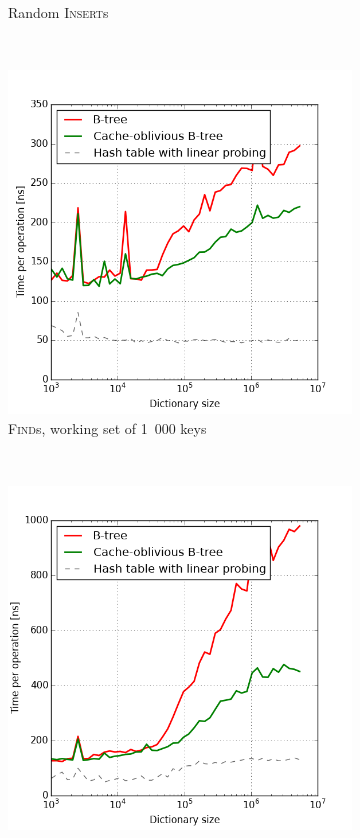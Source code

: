 \begin{figure}
\begin{subfigure}[b]{0.45\textwidth}
	\caption{Random \textsc{Insert}s}
\end{subfigure}
~
\begin{subfigure}[b]{0.45\textwidth}
	\includegraphics[width=\textwidth]{img/performance/cob-performance-3}
	\caption{\textsc{Find}s, working set of 1~000 keys}
\end{subfigure}
~
\begin{subfigure}[b]{0.45\textwidth}
	\includegraphics[width=\textwidth]{img/performance/cob-performance-4}

\end{subfigure}
\end{figure}

